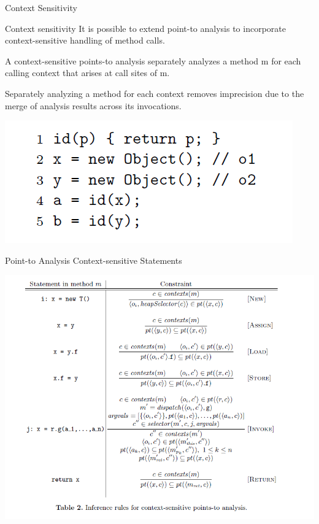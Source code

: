 \documentclass{beamer}
\begin{document}
\begin{frame}{Context Sensitivity}
	\begin{block}{Context sensitivity}
		It is possible to extend point-to analysis to incorporate context-sensitive handling of method calls. 
	\end{block}
	\pause
	\begin{block}{}
		A context-sensitive points-to analysis separately analyzes a method m for
		each calling context that arises at call sites of m. 
	\end{block}
	\pause
	\begin{block}{}
		Separately analyzing a method for each context removes imprecision due to
		the merge of analysis results across its invocations.
	\end{block}
	\pause
	\centerline{\includegraphics[width=0.5\paperwidth]{fig2.png}}
\end{frame}

\begin{frame}{Point-to Analysis Context-sensitive Statements}
	\centerline{\includegraphics[width=0.8\paperwidth]{table2.png}}
\end{frame}
\end{document}
